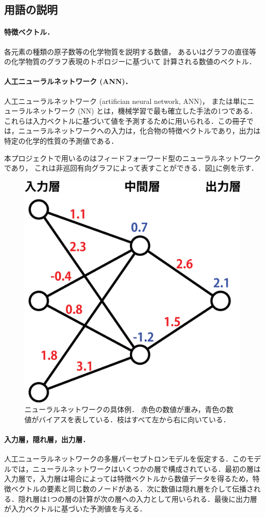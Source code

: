 \documentclass[11pt, titlepage, dvipdfmx, twoside]{jarticle}
\newcommand{\figref}[1]{図\ref{fig:#1}}
\begin{document}
\subsection{用語の説明}
\paragraph{特徴ベクトル．}
各元素の種類の原子数等の化学物質を説明する数値，
あるいはグラフの直径等の化学物質のグラフ表現のトポロジーに基づいて
計算される数値のベクトル．

\paragraph{人工ニューラルネットワーク (ANN)．}
人工ニューラルネットワーク (artifician neural network, ANN)，
または単にニューラルネットワーク (NN) とは，機械学習で最も確立した手法の1つである．これらは入力ベクトルに基づいて値を予測するために用いられる．この冊子では，ニューラルネットワークへの入力は，化合物の特徴ベクトルであり，出力は特定の化学的性質の予測値である．

本プロジェクトで用いるのはフィードフォーワード型のニューラルネットワークであり，
これは非巡回有向グラフによって表すことができる．\figref{sample}に例を示す．

\begin{figure}[h!]
  \centering
  \includegraphics[width = 0.4 \textwidth]{./fig/ANN_sample_jp}
  \caption{ニューラルネットワークの具体例．
  赤色の数値が重み，青色の数値がバイアスを表している．枝はすべて左から右に向いている．}
  \label{fig:sample}
\end{figure}

\paragraph{入力層，隠れ層，出力層．}
人工ニューラルネットワークの多層パーセプトロンモデルを仮定する．このモデルでは，ニューラルネットワークはいくつかの層で構成されている．最初の層は入力層で，入力層は場合によっては特徴ベクトルから数値データを得るため，特徴ベクトルの要素と同じ数のノードがある．次に数値は隠れ層を介して伝播される．隠れ層は1つの層の計算が次の層への入力として用いられる．最後に出力層が入力ベクトルに基づいた予測値を与える．
\end{document}
